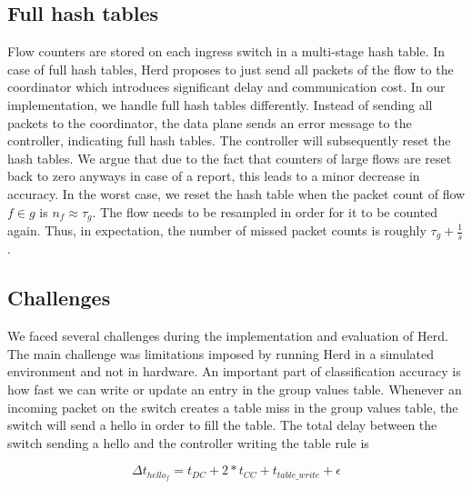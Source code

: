 \documentclass[11pt,oneside,a4paper]{article}
\begin{document}
\subsection{Full hash tables} \label{special}%

Flow counters are stored on each ingress switch in a multi-stage hash table. In case of full hash tables, Herd proposes to just send all packets of the flow to the coordinator which introduces significant delay and communication cost. In our implementation, we handle full hash tables differently. Instead of sending all packets to the coordinator, the data plane sends an error message to the controller, indicating full hash tables. The controller will subsequently reset the hash tables. We argue that due to the fact that counters of large flows are reset back to zero anyways in case of a report, this leads to a minor decrease in accuracy. In the worst case, we reset the hash table when the packet count of flow $f \in g$ is $n_f \approx \tau_g$. The flow needs to be resampled in order for it to be counted again. Thus, in expectation, the number of missed packet counts is roughly $\tau_g+\frac{1}{s}$. 

\subsection{Challenges} \label{challenges}

We faced several challenges during the implementation and evaluation of Herd. The main challenge was limitations imposed by running Herd in a simulated environment and not in hardware. An important part of classification accuracy is how fast we can write or update an entry in the group values table. Whenever an incoming packet on the switch creates a table miss in the group values table, the switch will send a hello in order to fill the table. The total delay between the switch sending a hello and the controller writing the table rule is 

$$\Delta t_{hello_f} = t_{DC} + 2*t_{CC} + t_{table\_write} + \epsilon$$
\end{document}
